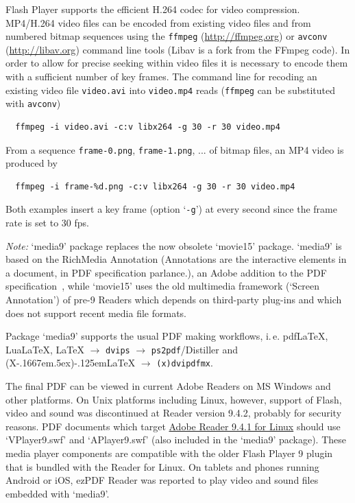 \documentclass[a4paper]{article}
\def\pXepLaTeX{(X\kern-.1667em\lower.5ex\hbox{\reflectbox{E}})\kern-.125em\LaTeX}
\begin{document}
Flash Player supports the efficient H.264 codec for video compression. MP4/H.264 video files can be encoded from existing video files and from numbered bitmap sequences using the \verb+ffmpeg+ (\url{http://ffmpeg.org}) or \verb+avconv+ (\url{http://libav.org}) command line tools (Libav is a fork from the FFmpeg code). In order to allow for precise seeking within video files it is necessary to encode them with a sufficient number of key frames. The command line for recoding an existing video file \verb+video.avi+ into \verb+video.mp4+ reads (\verb+ffmpeg+ can be substituted with \verb+avconv+)
\begin{Verbatim}
  ffmpeg -i video.avi -c:v libx264 -g 30 -r 30 video.mp4
\end{Verbatim}
From a sequence \verb+frame-0.png+, \verb+frame-1.png+, ... of bitmap files, an MP4 video is produced by
\begin{Verbatim}
  ffmpeg -i frame-%d.png -c:v libx264 -g 30 -r 30 video.mp4
\end{Verbatim}
Both examples insert a key frame (option `\verb+-g+') at every second since the frame rate is set to 30 fps.

\emph{Note:} `media9' package replaces the now obsolete `movie15' package. `media9' is based on the RichMedia Annotation (Annotations are the interactive elements in a document, in PDF specification parlance.), an Adobe addition to the PDF specification~\cite{supplement}, while `movie15' uses the old multimedia framework (`Screen Annotation') of pre-9 Readers which depends on third-party plug-ins and which does not support recent media file formats.

Package `media9' supports the usual PDF making workflows, i.\,e. pdf\LaTeX{}, Lua\LaTeX, \LaTeX{} $\rightarrow$ \verb+dvips+ $\rightarrow$ \verb+ps2pdf+/Distiller and \pXepLaTeX{} $\rightarrow$ \verb+(x)dvipdfmx+.

The final PDF can be viewed in current Adobe Readers on MS Windows and other platforms. On Unix platforms including Linux, however, support of Flash, video and sound was discontinued at Reader version 9.4.2, probably for security reasons. PDF documents which target \href{ftp://ftp.adobe.com/pub/adobe/reader/unix/9.x/9.4.1/}{Adobe Reader 9.4.1 for Linux} should use `VPlayer9.swf' and `APlayer9.swf' (also included in the `media9' package). These media player components are compatible with the older Flash Player 9 plugin that is bundled with the Reader for Linux. On tablets and phones running Android or iOS, ezPDF Reader was reported to play video and sound files embedded with `media9'.
\end{document}
